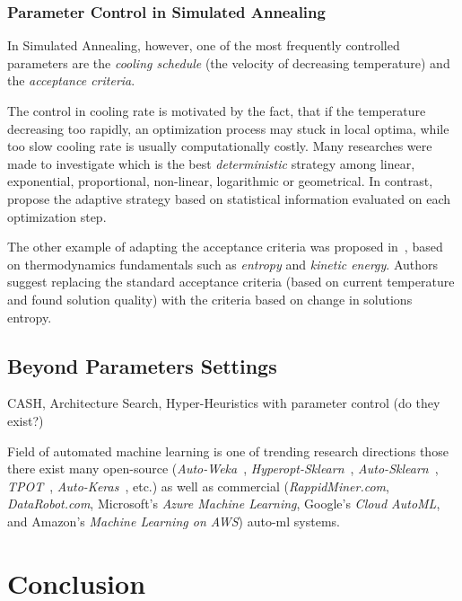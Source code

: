 \subsubsection{Parameter Control in Simulated Annealing}
In Simulated Annealing, however, one of the most frequently controlled parameters are the \textit{cooling schedule} (the velocity of decreasing temperature) and the \textit{acceptance criteria}.

The control in cooling rate is motivated by the fact, that if the temperature decreasing too rapidly, an optimization process may stuck in local optima, while too slow cooling rate is usually computationally costly. Many researches were made to investigate which is the best \textit{deterministic} strategy among linear, exponential, proportional, non-linear, logarithmic or geometrical. In contrast, \cite{karabin2020simulated} propose the adaptive strategy based on statistical information evaluated on each optimization step.

The other example of adapting the acceptance criteria was proposed in~\cite{ghandeshtani2019entropy}, based on thermodynamics fundamentals such as \textit{entropy} and \textit{kinetic energy}. Authors suggest replacing the standard acceptance criteria (based on current temperature and found solution quality) with the criteria based on change in solutions entropy.


\subsection{Beyond Parameters Settings} 

CASH, Architecture Search, Hyper-Heuristics with parameter control (do they exist?)


Field of automated machine learning is one of trending research directions those there exist many open-source (\textit{Auto-Weka}~\cite{thornton2013auto}, \textit{Hyperopt-Sklearn}~\cite{komer2014hyperopt}, \textit{Auto-Sklearn}~\cite{feurer2015efficient}, \textit{TPOT}~\cite{olson2019tpot}, \textit{Auto-Keras}~\cite{jin2019auto}, etc.) as well as commercial (\textit{RappidMiner.com}, \textit{DataRobot.com}, Microsoft’s \textit{Azure Machine Learning}, Google’s \textit{Cloud AutoML}, and Amazon's \textit{Machine Learning on AWS}) auto-ml systems.







\section{Conclusion}

